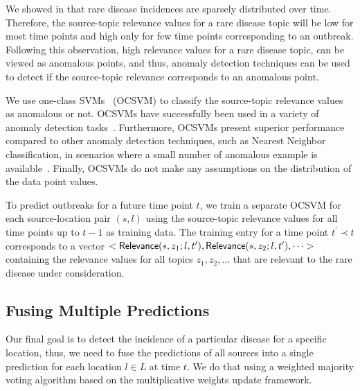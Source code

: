 \documentclass[conference]{IEEEtran}
\begin{document}
We showed in  that rare disease incidences are sparsely distributed over time. Therefore, the source-topic relevance values for a rare disease topic will be low for most time points and high only for few time points corresponding to an outbreak. Following this observation, high relevance values for a rare disease topic, can be viewed as anomalous points, and thus, anomaly detection techniques can be used to detect if the source-topic relevance corresponds to an anomalous point.

We use one-class SVMs~\cite{schoelkopf:99} (OCSVM) to classify the source-topic relevance values as anomalous or not. OCSVMs have successfully been used in a variety of anomaly detection tasks~\cite{manevitz:2002,steinwart:05, heller:03}. Furthermore, OCSVMs present superior performance compared to other anomaly detection techniques, such as Nearest Neighbor classification, in scenarios where a small number of anomalous example is available~\cite{khan:13}. Finally, OCSVMs do not make any assumptions on the distribution of the data point values.


To predict outbreaks for a future time point $t$, we train a separate OCSVM for each source-location pair $(s, l)$ using the source-topic relevance values for all time points up to $t-1$ as training data.  The training entry for a time point $t^{\prime} \prec t$ corresponds to a vector $<{\sf Relevance}(s,z_1;l,t^{\prime}), {\sf Relevance}(s,z_2;l,t^{\prime}), \dots>$ containing the relevance values for all topics $z_1, z_2, \dots$ that are relevant to the rare disease under consideration. 

\subsection{Fusing Multiple Predictions}
\label{sec:integration}
Our final goal is to detect the incidence of a particular disease for a specific location, thus, we need to fuse the predictions of all sources into a single prediction for each location $l \in L$ at time $t$. We do that using a weighted majority voting algorithm based on the multiplicative weights update framework\cite{arora:2012}.
\end{document}
